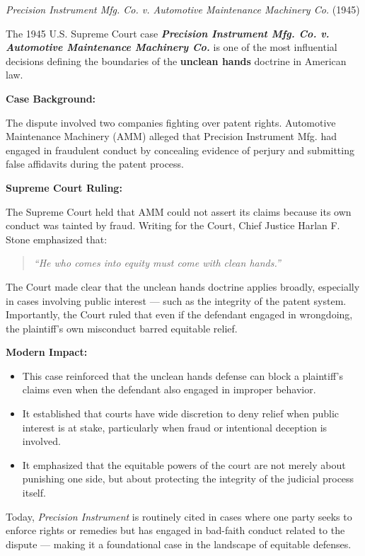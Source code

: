 \medskip

\begin{HistoricalSidebar}{\textit{Precision Instrument Mfg. Co. v. Automotive Maintenance Machinery Co.} (1945)}

    The 1945 U.S. Supreme Court case \textbf{\textit{Precision Instrument Mfg. Co. v. Automotive Maintenance Machinery Co.}} is one of the most influential decisions defining the boundaries of the \textbf{unclean hands} doctrine in American law.
    
    \medskip
    
    \textbf{Case Background:}
    
    The dispute involved two companies fighting over patent rights. Automotive Maintenance Machinery (AMM) alleged that Precision Instrument Mfg. had engaged in fraudulent conduct by concealing evidence of perjury and submitting false affidavits during the patent process.
    
    \medskip
    
    \textbf{Supreme Court Ruling:}
    
    The Supreme Court held that AMM could not assert its claims because its own conduct was tainted by fraud. Writing for the Court, Chief Justice Harlan F. Stone emphasized that:
    \begin{quote}
        \textit{“He who comes into equity must come with clean hands.”}
    \end{quote}
    
    The Court made clear that the unclean hands doctrine applies broadly, especially in cases involving public interest — such as the integrity of the patent system. Importantly, the Court ruled that even if the defendant engaged in wrongdoing, the plaintiff's own misconduct barred equitable relief.
    
    \medskip
    
    \textbf{Modern Impact:}
    
    \begin{itemize}
        \item This case reinforced that the unclean hands defense can block a plaintiff's claims even when the defendant also engaged in improper behavior.
        \item It established that courts have wide discretion to deny relief when public interest is at stake, particularly when fraud or intentional deception is involved.
        \item It emphasized that the equitable powers of the court are not merely about punishing one side, but about protecting the integrity of the judicial process itself.
    \end{itemize}
    
    \medskip
    
    Today, \textit{Precision Instrument} is routinely cited in cases where one party seeks to enforce rights or remedies but has engaged in bad-faith conduct related to the dispute — making it a foundational case in the landscape of equitable defenses.
    
\end{HistoricalSidebar}
    
